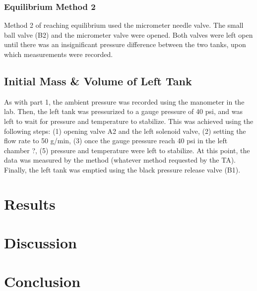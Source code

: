 \documentclass{article} %
\begin{document}
\begin{multicols}{2}
\subsubsection{Equilibrium Method 2}

Method 2 of reaching equilibrium used the micrometer needle valve.
The small ball valve (B2) and the micrometer valve were opened.
Both valves were left open until there was an insignificant pressure difference between the two tanks, upon which measurements were recorded.

\subsection{Initial Mass \& Volume of Left Tank}
\label{methods_initial_mass_volume_left_tank}

As with part 1, the ambient pressure was recorded using the manometer in the lab.
Then, the left tank was pressurized to a gauge pressure of 40 psi, and was left to wait for pressure and temperature to stabilize.
This was achieved using the following steps:
(1) opening valve A2 and the left solenoid valve, (2) setting the flow rate to 50 g/min, (3) once the gauge pressure reach 40 psi in the left chamber ?, (5) pressure and temperature were left to stabilize.
At this point, the data was measured by the method (whatever method requested by the TA).
Finally, the left tank was emptied using the black pressure release valve (B1).

\section{Results}
\label{results}

\section{Discussion}
\label{discussion}

\section{Conclusion}
\label{conclusion}

\label{last_page}

\newpage



\end{multicols}
\end{document}
